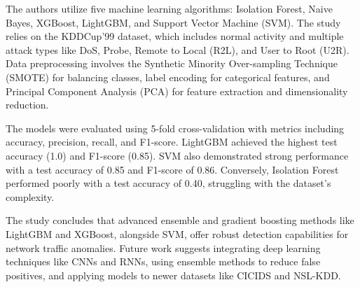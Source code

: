 \documentclass[12pt,a4paper]{report}
\begin{document}
The authors utilize five machine learning algorithms: Isolation Forest, Naive Bayes, XGBoost, LightGBM, and Support Vector Machine (SVM). The study relies on the KDDCup'99 dataset, which includes normal activity and multiple attack types like DoS, Probe, Remote to Local (R2L), and User to Root (U2R). Data preprocessing involves the Synthetic Minority Over-sampling Technique (SMOTE) for balancing classes, label encoding for categorical features, and Principal Component Analysis (PCA) for feature extraction and dimensionality reduction.

The models were evaluated using 5-fold cross-validation with metrics including accuracy, precision, recall, and F1-score. LightGBM achieved the highest test accuracy (1.0) and F1-score (0.85). SVM also demonstrated strong performance with a test accuracy of 0.85 and F1-score of 0.86. Conversely, Isolation Forest performed poorly with a test accuracy of 0.40, struggling with the dataset's complexity.

The study concludes that advanced ensemble and gradient boosting methods like LightGBM and XGBoost, alongside SVM, offer robust detection capabilities for network traffic anomalies. Future work suggests integrating deep learning techniques like CNNs and RNNs, using ensemble methods to reduce false positives, and applying models to newer datasets like CICIDS and NSL-KDD.
\end{document}
